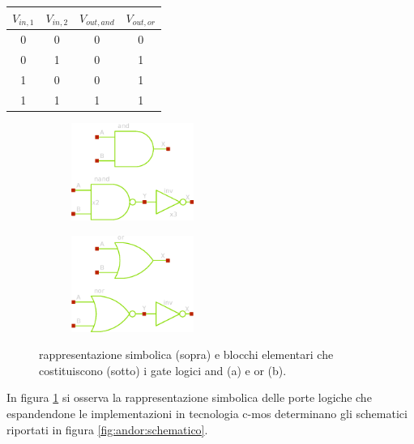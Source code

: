 	\begin{center}
		\begin{tabular}{c c | c | c}
			$V_{in,1}$ & $V_{in,2}$ & $V_{out,and}$ & $V_{out,or}$ \\ \hline
			0 & 0 & 0 & 0 \\
			0 & 1 & 0 & 1 \\
			1 & 0 & 0 & 1 \\
			1 & 1 & 1 & 1 \\
		\end{tabular}
	\end{center}

	\begin{figure}[bht]
		\centering
		\begin{subfigure}{0.48\linewidth}
			\centering \includegraphics[width=4cm]{Immagini/and-simple} \caption{}
		\end{subfigure}
		\begin{subfigure}{0.48\linewidth}
			\centering \includegraphics[width=4cm]{Immagini/or-simple} \caption{}
		\end{subfigure}
		\caption{rappresentazione simbolica (sopra) e blocchi elementari che costituiscono (sotto) i gate logici and (a) e or (b).}
		\label{fig:andor:simbolo}
	\end{figure}
	
	In figura \ref{fig:andor:simbolo} si osserva la rappresentazione simbolica delle porte logiche che espandendone le implementazioni in tecnologia c-mos determinano gli schematici riportati in figura \ref{fig:andor:schematico}.
	
